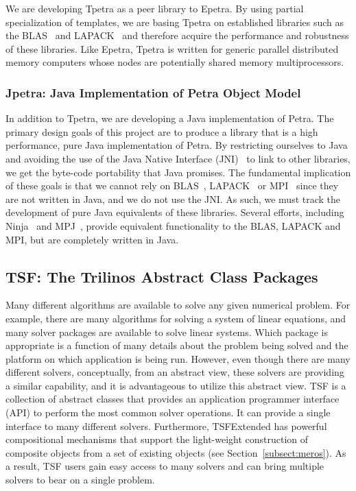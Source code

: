 \documentclass[acmtoms,acmnow]{acmtrans2m}
\begin{document}
We are developing Tpetra as a peer library to Epetra. By using partial
specialization of templates, we are basing Tpetra on established libraries 
such as the BLAS~\cite{BLAS1,BLAS2,BLAS3} and LAPACK~\cite{lapack} and 
therefore acquire the performance and robustness of these libraries.
Like Epetra, Tpetra is written for generic parallel distributed
memory computers whose nodes are
potentially shared memory multiprocessors.

\subsubsection{Jpetra: Java Implementation of Petra Object Model}

In addition to Tpetra, we are developing a Java implementation of Petra.  
The primary design goals of this project are to produce a library that 
is a high performance, pure Java implementation of Petra.  By restricting 
ourselves to Java and avoiding the use of the Java Native Interface 
(JNI)~\cite{JNI-site} to link to other libraries, we get the byte-code 
portability that Java promises.  The fundamental implication of these 
goals is that we cannot rely on BLAS~\cite{BLAS1,BLAS2,BLAS3}, 
LAPACK~\cite{lapack} or MPI~\cite{MPI} since they are not written in 
Java, and we do not use the JNI.  As such, we must track the development 
of pure Java equivalents of these libraries.  Several efforts, including 
Ninja~\cite{MoreMidkGuptArtiWuAlma2001} and 
MPJ~\cite{CarpGetoJuddSkjeFox2000}, provide equivalent functionality 
to the BLAS, LAPACK and MPI, but are completely written in Java.

\subsection{TSF: The Trilinos Abstract Class Packages}

Many different algorithms are available to solve any given numerical
problem.  For example, there are many algorithms for solving a system
of linear equations, and many solver packages are available to solve
linear systems.  Which package is appropriate is a function of
many details about the problem being solved and the platform on which
application is being run. However, even though
there are many different solvers, conceptually, from an abstract view,
these solvers are providing a similar capability, and it is
advantageous to utilize this abstract view.
TSF is a collection of abstract classes that provides an application
programmer interface (API) to perform the most common solver
operations.  It can provide a single interface to many different
solvers.  Furthermore, TSFExtended has powerful compositional
mechanisms that support the
light-weight construction of composite objects from a set of
existing objects (see Section~\ref{subsect:meros}).
As a result, TSF users gain easy access to many
solvers and can bring multiple solvers to bear on a single problem.
\end{document}
